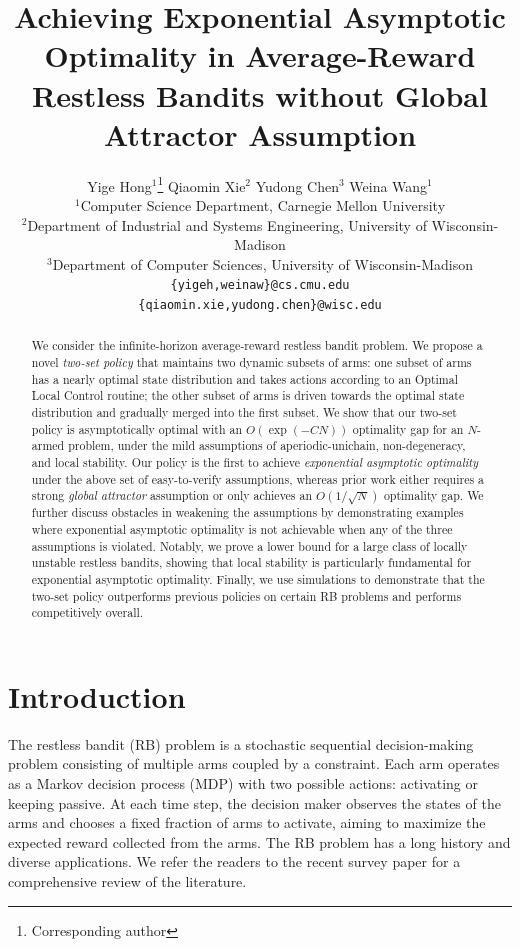 \documentclass[11pt,letterpaper]{article}
\author{%
   Yige Hong$^1$\thanks{Corresponding author} \quad Qiaomin Xie$^2$ \quad Yudong Chen$^3$ \quad  Weina Wang$^1$   \medskip\\
   $^1$Computer Science Department, Carnegie Mellon University  \\ $^2$Department of Industrial and Systems Engineering, University of Wisconsin-Madison  \\ $^3$Department of Computer Sciences, University of Wisconsin-Madison \smallskip \\
   \texttt{\{yigeh,weinaw\}@cs.cmu.edu}\\
   \texttt{\{qiaomin.xie,yudong.chen\}@wisc.edu}
 }
\title{Achieving Exponential Asymptotic Optimality in Average-Reward Restless Bandits without Global Attractor Assumption}
\date{}
\theoremstyle{plain}
\theoremstyle{definition}
\theoremstyle{remark}
\begin{document}
\maketitle
\begin{abstract}
    We consider the infinite-horizon average-reward restless bandit problem. 
    We propose a novel \emph{two-set policy} that maintains two dynamic subsets of arms: 
    one subset of arms has a nearly optimal state distribution and takes actions according to an Optimal Local Control routine; the other subset of arms is driven towards the optimal state distribution and gradually merged into the first subset. 
    We show that our two-set policy is asymptotically optimal with an $O(\exp(-C N))$ optimality gap for an $N$-armed problem, under the mild assumptions of aperiodic-unichain, non-degeneracy, and local stability. 
    Our policy is the first to achieve \emph{exponential asymptotic optimality} under the above set of easy-to-verify assumptions, whereas prior work either requires a strong \emph{global attractor} assumption or only achieves an $O(1/\sqrt{N})$ optimality gap. 
    We further discuss obstacles in weakening the assumptions by demonstrating examples where exponential asymptotic optimality is not achievable when any of the three assumptions is violated.
    Notably, we prove a lower bound for a large class of locally unstable restless bandits, showing that local stability is particularly fundamental for exponential asymptotic optimality. 
    Finally, we use simulations to demonstrate that the two-set policy outperforms previous policies on certain RB problems and performs competitively overall. 
\end{abstract}




\section{Introduction}\label{sec:intro}

The restless bandit (RB) \citep{Whi_88_rb} problem is a stochastic sequential decision-making problem consisting of multiple arms coupled by a constraint. 
Each arm operates as a Markov decision process (MDP) with two possible actions: activating or keeping passive. 
At each time step, the decision maker observes the states of the arms and chooses a fixed fraction of arms to activate, aiming to maximize the expected reward collected from the arms. 
The RB problem has a long history and diverse applications. We refer the readers to the recent survey paper \citep{Nin_23} for a comprehensive review of the literature. 
\end{document}
